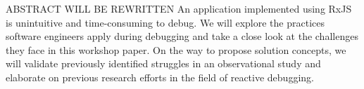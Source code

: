 ABSTRACT WILL BE REWRITTEN An application implemented using RxJS is unintuitive and time-consuming to debug. We will explore the practices software engineers apply during debugging and take a close look at the challenges they face in this workshop paper. On the way to propose solution concepts, we will validate previously identified struggles in an observational study and elaborate on previous research efforts in the field of reactive debugging.
